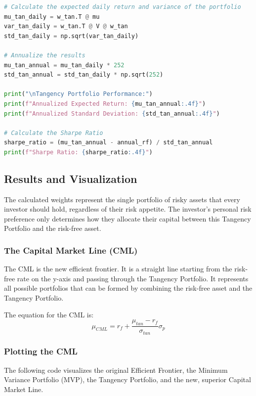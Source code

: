 \begin{lstlisting}[language=Python, caption=Calculating Tangency Portfolio Coordinates]
# Calculate the expected daily return and variance of the portfolio
mu_tan_daily = w_tan.T @ mu
var_tan_daily = w_tan.T @ V @ w_tan
std_tan_daily = np.sqrt(var_tan_daily)

# Annualize the results
mu_tan_annual = mu_tan_daily * 252
std_tan_annual = std_tan_daily * np.sqrt(252)

print("\nTangency Portfolio Performance:")
print(f"Annualized Expected Return: {mu_tan_annual:.4f}")
print(f"Annualized Standard Deviation: {std_tan_annual:.4f}")

# Calculate the Sharpe Ratio
sharpe_ratio = (mu_tan_annual - annual_rf) / std_tan_annual
print(f"Sharpe Ratio: {sharpe_ratio:.4f}")
\end{lstlisting}

\subsection*{Results and Visualization}

The calculated weights represent the single portfolio of risky assets that every investor should hold, regardless of their risk appetite. The investor's personal risk preference only determines how they allocate their capital between this Tangency Portfolio and the risk-free asset.

\subsubsection*{The Capital Market Line (CML)}
The CML is the new efficient frontier. It is a straight line starting from the risk-free rate on the y-axis and passing through the Tangency Portfolio. It represents all possible portfolios that can be formed by combining the risk-free asset and the Tangency Portfolio.

The equation for the CML is:
\begin{equation}
    \mu_{CML} = r_f + \frac{\mu_{tan} - r_f}{\sigma_{tan}}\sigma_p
\end{equation}

\subsubsection*{Plotting the CML}
The following code visualizes the original Efficient Frontier, the Minimum Variance Portfolio (MVP), the Tangency Portfolio, and the new, superior Capital Market Line.

